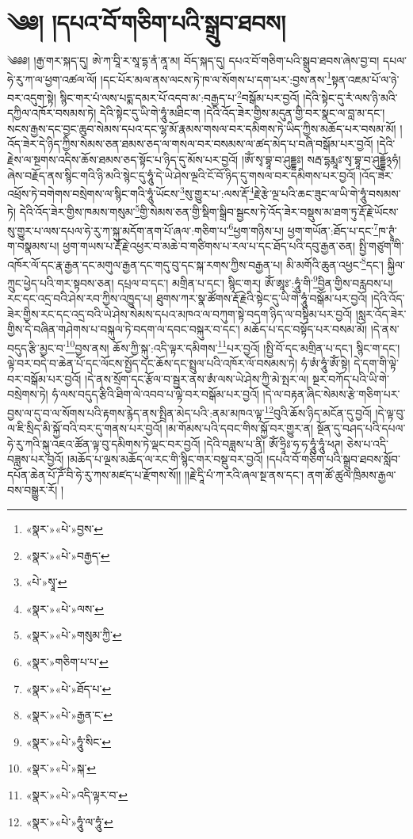 \chapter{༄༅། །དཔའ་བོ་གཅིག་པའི་སྒྲུབ་ཐབས།}༄༅༅། །རྒྱ་གར་སྐད་དུ། ཨེ་ཀ་བཱི་ར་སཱ་དྷ་ནཾ་ནཱ་མ། བོད་སྐད་དུ། དཔའ་བོ་གཅིག་པའི་སྒྲུབ་ཐབས་ཞེས་བྱ་བ། དཔལ་ཧེ་རུ་ཀ་ལ་ཕྱག་འཚལ་ལོ། །དང་པོར་མལ་ནས་ལངས་ཏེ་ཁ་ལ་སོགས་པ་དག་པར་:བྱས་ནས་\footnote{«སྣར་»«པེ་»བྱས་}སྟན་འཇམ་པོ་ལ་ཉེ་བར་འདུག་སྟེ། སྙིང་གར་པཾ་ལས་པདྨ་དམར་པོ་འདབ་མ་:བརྒྱད་པ་\footnote{«སྣར་»«པེ་»བརྒྱད་}བསྒོམ་པར་བྱའོ། །དེའི་སྟེང་དུ་རཾ་ལས་ཉི་མའི་དཀྱིལ་འཁོར་བསམས་ཏེ། དེའི་སྟེང་དུ་ཡི་གེ་ཧཱུཾ་མཐིང་ག །དེའི་འོད་ཟེར་གྱིས་མདུན་གྱི་བར་སྣང་ལ་བླ་མ་དང་། སངས་རྒྱས་དང་བྱང་ཆུབ་སེམས་དཔའ་དང་ལྷ་མོ་རྣམས་གསལ་བར་དམིགས་ཏེ་ཡིད་ཀྱིས་མཆོད་པར་བསམ་མོ། །འོད་ཟེར་དེ་ཉིད་ཀྱིས་སེམས་ཅན་ཐམས་ཅད་ལ་གསལ་བར་བསམས་ལ་ཚད་མེད་པ་བཞི་བསྒོམ་པར་བྱའོ། །དེའི་རྗེས་ལ་སྔགས་འདིས་ཆོས་ཐམས་ཅད་སྟོང་པ་ཉིད་དུ་མོས་པར་བྱའོ། །ཨོཾ་སྭ་བྷཱ་བ་ཤུདྡྷཿ། སརྦ་དྷརྨཱཿ་སྭ་བྷཱ་བ་ཤུདྡྷོ྅ཧཾ། ཞེས་བརྗོད་ནས་སྙིང་གའི་ཉི་མའི་སྙེང་དུ་ཧཱུཾ་དེ་ཡེ་ཤེས་ལྔའི་ངོ་བོ་ཉིད་དུ་གསལ་བར་དམིགས་པར་བྱའོ། །འོད་ཟེར་འཕྲོས་ཏེ་བགེགས་བསྲེགས་ལ་སྙིང་གའི་ཧཱུཾ་ཡོངས་\footnote{«པེ་»སྭཱ་}སུ་གྱུར་པ་:ལས་རྡོ་\footnote{«སྣར་»«པེ་»ལས་}རྗེ་རྩེ་ལྔ་པའི་ཆང་ཟུང་ལ་ཡི་གེ་ཧཱུཾ་བསམས་ཏེ། དེའི་འོད་ཟེར་གྱིས་ཁམས་གསུམ་\footnote{«སྣར་»«པེ་»གསུམ་ཀྱི་}གྱི་སེམས་ཅན་གྱི་སྡིག་སྒྲིབ་སྦྱངས་ཏེ་འོད་ཟེར་བསྡུས་མ་ཐག་ཏུ་རྡོ་རྗེ་ཡོངས་སུ་གྱུར་པ་ལས་དཔལ་ཧེ་རུ་ཀ་སྐུ་མདོག་ནག་པོ་ཞལ་:གཅིག་པ་\footnote{«སྣར་»གཅིག་པ་པ་}ཕྱག་གཉིས་པ། ཕྱག་གཡོན་:ཐོད་པ་དང་\footnote{«སྣར་»«པེ་»ཐོད་པ་}ཁ་ཊྭཱཾ་ག་བསྣམས་པ། ཕྱག་གཡས་པ་རྡོ་རྗེ་འཕྱར་བ་མཆེ་བ་གཙིགས་པ་རལ་པ་དང་ཐོད་པའི་དབུ་རྒྱན་ཅན། སྤྱི་གཙུག་གི་འཁོར་ལོ་དང་རྣ་རྒྱན་དང་མགུལ་རྒྱན་དང་གདུ་བུ་དང་སྐ་རགས་ཀྱིས་བརྒྱན་པ། མི་མགོའི་ཆུན་འཕྱང་\footnote{«སྣར་»«པེ་»རྒྱན་ང་}དང་། སྐྱིལ་ཀྲུང་ཕྱེད་པའི་གར་སྟབས་ཅན། དཔྲལ་བ་དང་། མགྲིན་པ་དང་། སྙིང་གར། ཨོཾ་ཨཱཿ་:ཧཱུཾ་གི་\footnote{«སྣར་»«པེ་»ཧཱུཾ་སིང་}བྱིན་གྱིས་བརླབས་པ། རང་དང་འདྲ་བའི་ཤེས་རབ་ཀྱིས་འཁྱུད་པ། ཐུགས་ཀར་སྣ་ཚོགས་རྡོ་རྗེའི་སྟེང་དུ་ཡི་གེ་ཧཱུཾ་བསྒོམ་པར་བྱའོ། །དེའི་འོད་ཟེར་གྱིས་རང་དང་འདྲ་བའི་ཡེ་ཤེས་སེམས་དཔའ་མཁའ་ལ་བཀུག་སྟེ་བདག་ཉིད་ལ་བསྟིམ་པར་བྱའོ། །སླར་འོད་ཟེར་གྱིས་དེ་བཞིན་གཤེགས་པ་བསྐུལ་ཏེ་བདག་ལ་དབང་བསྐུར་བ་དང་། མཆོད་པ་དང་བསྟོད་པར་བསམ་མོ། །དེ་ནས་བདུད་རྩི་མྱང་བ་\footnote{«སྣར་»«པེ་»སྐ་}བྱས་ནས། ཆོས་ཀྱི་སྐུ་:འདི་ལྟར་དམིགས་\footnote{«སྣར་»«པེ་»འདི་ལྟར་བ་}པར་བྱའོ། །སྤྱི་བོ་དང་མགྲིན་པ་དང་། སྙིང་ག་དང་། ལྟེ་བར་བདེ་བ་ཆེན་པོ་དང་ལོངས་སྤྱོད་དང་ཆོས་དང་སྤྲུལ་པའི་འཁོར་ལོ་བསམས་ཏེ། ཧཾ་ཨཾ་ཧཱུཾ་ཨོཾ་སྟེ། དེ་དག་གི་ལྟེ་བར་བསྒོམ་པར་བྱའོ། །དེ་ནས་སྲོག་དང་རྩོལ་བ་སྦྱར་ནས་ཨཾ་ལས་ཡེ་ཤེས་ཀྱི་མེ་སྤར་ལ། སྔར་བཀོད་པའི་ཡི་གེ་བསྲེགས་ཏེ། ཧཾ་ལས་བདུད་རྩིའི་ཐིག་ལེ་འབབ་པ་ལྟེ་བར་བསྒོམ་པར་བྱའོ། །དེ་ལ་བརྟན་ཞིང་སེམས་རྩེ་གཅིག་པར་བྱས་ལ་དུ་བ་ལ་སོགས་པའི་རྟགས་རྙེད་ནས་སྤྲིན་མེད་པའི་:ནམ་མཁའ་ལྟ་\footnote{«སྣར་»«པེ་»ཧཱུཾ་ལ་ཧཱུཾ་}བུའི་ཆོས་ཉིད་མངོན་དུ་བྱའོ། །དེ་ལྟ་བུ་ལ་ཇི་སྲིད་མི་སྐྱོ་བའི་བར་དུ་གནས་པར་བྱའོ། །མ་གོམས་པའི་དབང་གིས་སྐྱོ་བར་གྱུར་ན། སྔོན་དུ་བཤད་པའི་དཔལ་ཧེ་རུ་ཀའི་སྐུ་འཇའ་ཚོན་ལྟ་བུ་དམིགས་ཏེ་ལྡང་བར་བྱའོ། །དེའི་བཟླས་པ་ནི། ཨོཾ་ཧྲཱིཿ་ཧ་ཧ་ཧཱུཾ་ཧཱུཾ་ཕཊ། ཅེས་པ་འདི་བཟླས་པར་བྱའོ། །མཆོད་པ་ལྔས་མཆོད་ལ་རང་གི་སྙིང་གར་བསྡུ་བར་བྱའོ། །དཔའ་བོ་གཅིག་པའི་སྒྲུབ་ཐབས་སློབ་དཔོན་ཆེན་པོ་ཌོཾ་བི་ཧེ་རུ་ཀས་མཛད་པ་རྫོགས་སོ།། །།རྗེ་དཱི་པཾ་ཀ་རའི་ཞལ་སྔ་ནས་དང་། ནག་ཚོ་ཚུལ་ཁྲིམས་རྒྱལ་བས་བསྒྱུར་རོ། ། 